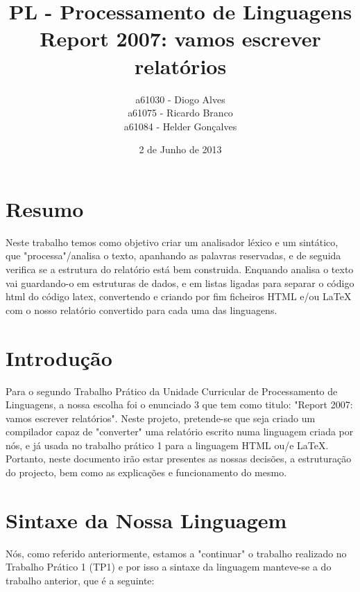 \documentclass{report}
\title{PL - Processamento de Linguagens\\Report 2007: vamos escrever relatórios}
\author{a61030 - Diogo Alves\\a61075 - Ricardo Branco\\a61084 - Helder Gonçalves}
\date{2 de Junho de 2013}
\begin{document}
\maketitle

\tableofcontents

\chapter{Resumo}

Neste trabalho temos como objetivo criar um analisador léxico e um sintático, que "processa"/analisa o texto, apanhando as palavras reservadas, e de seguida verifica se a estrutura do relatório está bem construida. Enquando analisa o texto vai guardando-o em estruturas de dados, e em listas ligadas para separar o código html do código latex, convertendo e criando por fim ficheiros HTML e/ou LaTeX com o nosso relatório convertido para cada uma das linguagens. 


\chapter{Introdução}

Para o segundo Trabalho Prático da Unidade Curricular de Processamento de Linguagens, a nossa escolha foi o enunciado 3 que tem como titulo: "Report 2007: vamos escrever relatórios".
Neste projeto, pretende-se que seja criado um compilador capaz de "converter" uma relatório escrito numa linguagem criada por nós, e já usada no trabalho prático 1 para a linguagem HTML ou/e LaTeX.  
Portanto, neste documento irão estar presentes as nossas decisões, a estruturação do projecto, bem como as explicações e funcionamento do mesmo.



\chapter{Sintaxe da Nossa Linguagem}

Nós, como referido anteriormente, estamos a "continuar" o trabalho realizado no Trabalho Prático 1 (TP1) e por isso a sintaxe da linguagem manteve-se a do trabalho anterior, que é a seguinte:
\end{document}

